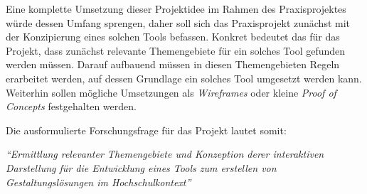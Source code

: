 Eine komplette Umsetzung dieser Projektidee im Rahmen des Praxisprojektes würde dessen Umfang sprengen, daher soll sich das Praxisprojekt zunächst mit der Konzipierung eines solchen Tools befassen. Konkret bedeutet das für das Projekt, dass zunächst relevante Themengebiete für ein solches Tool gefunden werden müssen. Darauf aufbauend müssen in diesen Themengebieten Regeln erarbeitet werden, auf dessen Grundlage ein solches Tool umgesetzt werden kann. Weiterhin sollen mögliche Umsetzungen als \textit{Wireframes} oder kleine \textit{Proof of Concepts} festgehalten werden.

Die ausformulierte Forschungsfrage für das Projekt lautet somit:

\textit{“Ermittlung relevanter Themengebiete und Konzeption derer interaktiven Darstellung für die Entwicklung eines Tools zum erstellen von Gestaltungslösungen im Hochschulkontext”}



\clearpage
